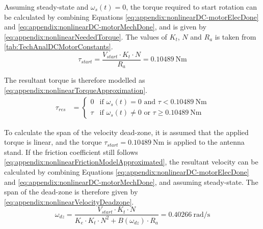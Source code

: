 Assuming steady-state and $\omega_s(t) = 0$, the torque required to start rotation can be calculated by combining Equations \ref{eq:appendix:nonlinearDC-motorElecDone} and \ref{eq:appendix:nonlinearDC-motorMechDone}, and is given by \autoref{eq:appendix:nonlinearNeededTorque}. The values of $K_t$, $N$ and $R_a$ is taken from \autoref{tab:TechAnalDCMotorConstants}.
\begin{equation} \label{eq:appendix:nonlinearNeededTorque}
\tau_{start} = \frac{V_{start} \cdot K_t \cdot N}{R_a} = \SI{0.10489}{\newton\meter}
\end{equation}
\startexplain
{}
\stopexplain

The resultant torque is therefore modelled as \autoref{eq:appendix:nonlinearTorqueApproximation}.
\begin{align} \label{eq:appendix:nonlinearTorqueApproximation}
\tau_{res} &=
  \begin{cases}
	0   		& \text{if } \omega_s(t) = 0 \text{ and } \tau < \SI{0.10489}{\newton\meter} \\
	\tau		& \text{if } \omega_s(t) \neq 0 \text{ or } \tau \geq \SI{0.10489}{\newton\meter}
  \end{cases}
\end{align}
\startexplain
{}
\stopexplain

To calculate the span of the velocity dead-zone, it is assumed that the applied torque is linear, and the torque $\tau_{start} = \SI{0.10489}{\newton\meter}$ is applied to the antenna stand. If the friction coefficient still follows \autoref{eq:appendix:nonlinearFrictionModelApproximated}, the resultant velocity can be calculated by combining Equations \ref{eq:appendix:nonlinearDC-motorElecDone} and \ref{eq:appendix:nonlinearDC-motorMechDone}, and assuming steady-state. The span of the dead-zone is therefore given by \autoref{eq:appendix:nonlinearVelocityDeadzone}.
\begin{equation} \label{eq:appendix:nonlinearVelocityDeadzone}
\omega_{dz} = \frac{V_{start}\cdot K_t \cdot N}{K_e\cdot K_t\cdot N^2+ B(\omega_{dz})\cdot R_a} = \SI{0.40266}{\radian\per\second}
\end{equation}

